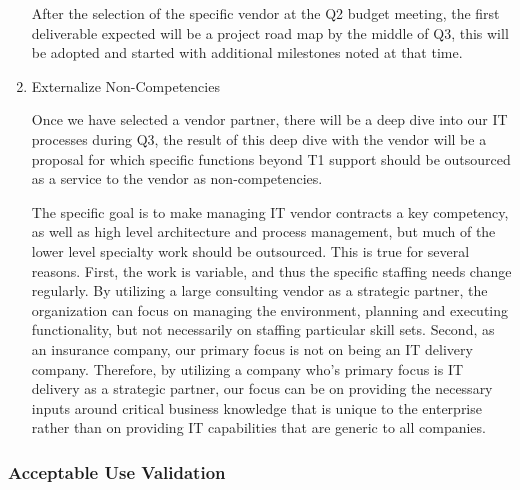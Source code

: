 \documentclass[stu]{apa7}
\begin{document}
\begin{enumerate}
After the selection of the specific vendor at the Q2 budget meeting, the first deliverable expected will be a project road map by the middle of Q3, this will be adopted and started with additional milestones noted at that time.

\item Externalize Non-Competencies
\label{sec:org0da2355}

Once we have selected a vendor partner, there will be a deep dive into our IT processes during Q3, the result of this deep dive with the vendor will be a proposal for which specific functions beyond T1 support should be outsourced as a service to the vendor as non-competencies.

The specific goal is to make managing IT vendor contracts a key competency, as well as high level architecture and process management, but much of the lower level specialty work should be outsourced. This is true for several reasons. First, the work is variable, and thus the specific staffing needs change regularly. By utilizing a large consulting vendor as a strategic partner, the organization can focus on managing the environment, planning and executing functionality, but not necessarily on staffing particular skill sets. Second, as an insurance company, our primary focus is not on being an IT delivery company. Therefore, by utilizing a company who's primary focus is IT delivery as a strategic partner, our focus can be on providing the necessary inputs around critical business knowledge that is unique to the enterprise rather than on providing IT capabilities that are generic to all companies.
\end{enumerate}


\subsubsection{Acceptable Use Validation}
\label{sec:org62cc78c}
\end{document}
